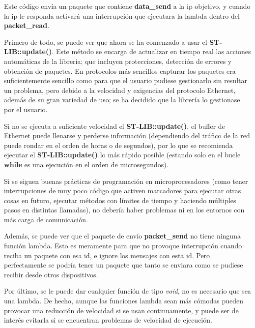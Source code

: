 \documentclass{report}
\begin{document}
Este código envía un paquete que contiene \textbf{data\_send} a la ip objetivo, y cuando la ip le responda activará una interrupción que ejecutara la lambda dentro del \textbf{packet\_read}. 
\par
Primero de todo, se puede ver que ahora se ha comenzado a usar el \textbf{ST-LIB::update()}. Este método se encarga de actualizar en tiempo real las acciones automáticas de la librería; que incluyen protecciones, detección de errores y obtención de paquetes. En protocolos más sencillos capturar los paquetes era suficientemente sencillo como para que el usuario pudiese gestionarlo sin resultar un problema, pero debido a la velocidad y exigencias del protocolo Ethernet, además de su gran variedad de uso; se ha decidido que la librería lo gestionase por el usuario. 
\par \vspace{0.3cm}
Si no se ejecuta a suficiente velocidad el \textbf{ST-LIB::update()}, el buffer de Ethernet puede llenarse y perderse información (dependiendo del tráfico de la red puede rondar en el orden de horas o de segundos), por lo que se recomienda ejecutar el \textbf{ST-LIB::update()} lo más rápido posible (estando solo en el bucle \textbf{while} es una ejecución en el orden de microsegundos). 
\par
 Si se siguen buenas prácticas de programación en microprocesadores (como tener interrupciones de muy poco código que activen marcadores para ejecutar otras cosas en futuro, ejecutar métodos con límites de tiempo y haciendo múltiples pasos en distintas llamadas), no debería haber problemas ni en los entornos con más carga de comunicación. 
 \par \vspace{0.3cm}
 Además, se puede ver que el paquete de envío \textbf{packet\_send} no tiene ninguna función lambda. Esto es meramente para que no provoque interrupción cuando reciba un paquete con esa id, e ignore los mensajes con esta id. Pero perfectamente se podría tener un paquete que tanto se enviara como se pudiese recibir desde otros dispositivos. \par
 Por último, se le puede dar cualquier función de tipo \textit{void}, no es necesario que sea una lambda. De hecho, aunque las funciones lambda sean más cómodas pueden provocar una reducción de velocidad si se usan continuamente, y puede ser de interés evitarla si se encuentran problemas de velocidad de ejecución. 
\end{document}
